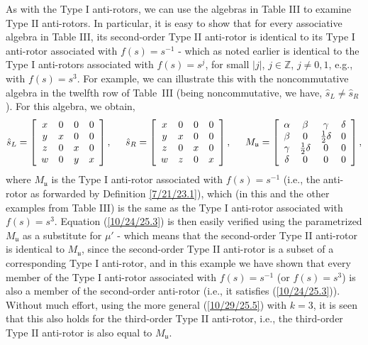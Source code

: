 \documentclass{amsart}
\theoremstyle{definition}
\numberwithin{theorem}{section}
\numberwithin{equation}{section}
\begin{document}
As with the Type I anti-rotors, we can use the algebras in Table III to examine Type II anti-rotors.  In particular, it is easy to show that for every associative algebra in Table III, its second-order Type II anti-rotor is identical to its Type I anti-rotor associated with $f(s)=s^{-1}$ - which as noted earlier is identical to the Type I anti-rotors associated with \mbox{$f(s)=s^j$}, for small $|j|$, $j\in \mathbb{Z}$, $j\ne 0,1$, e.g., with $f(s)=s^3$.   
For example, we can illustrate this with the noncommutative algebra in the twelfth row of \mbox{Table III} (being noncommutative, we have, $\hat{s}_L\ne \hat{s}_R$).  For this algebra, we obtain,
\[ \hat{s}_L = \left[
\begin{array}{cccc}
x & 0 & 0 & 0   \\
y & x & 0 & 0 \\
z & 0 &  x & 0   \\
w & 0 &  y & x
\end{array}
\right], \hspace{5mm} \hat{s}_R = \left[
\begin{array}{cccc}
x & 0 & 0 & 0   \\
y & x & 0 & 0 \\
z & 0 &  x & 0   \\
w & z &  0 & x  
\end{array}\right], \hspace{5mm} M_\mathfrak{u} = \left[
\begin{array}{cccc}
\alpha & \beta & \gamma & \delta   \\
\beta & 0 & \frac{1}{2}\delta & 0 \\
\gamma & \frac{1}{2}\delta &  0 & 0   \\
\delta & 0 &  0 & 0
\end{array}
\right] ,\] where $M_\mathfrak{u}$ is the Type I anti-rotor associated with $f(s)=s^{-1}$ (i.e., the anti-rotor as forwarded by Definition \ref{7/21/23.1}), which (in this and the other examples from Table III) is the same as the Type I anti-rotor associated with $f(s)=s^3$.
Equation (\ref{10/24/25.3}) is then easily verified using the parametrized $M_\mathfrak{u}$ as a substitute for $\mu'$ - which means that the second-order Type II anti-rotor is identical to $M_\mathfrak{u}$, since the second-order Type II anti-rotor is a subset of a corresponding Type I anti-rotor, and in this example we have shown that every member of the Type I anti-rotor associated with $f(s)=s^{-1}$ (or $f(s)=s^3$) is also a member of the second-order anti-rotor (i.e., it satisfies (\ref{10/24/25.3})).  Without much effort, using the more general (\ref{10/29/25.5}) with $k=3$, it is seen that this also holds for the third-order Type II anti-rotor, i.e., the third-order Type II anti-rotor is also equal to $M_\mathfrak{u}$.   
\end{document}
